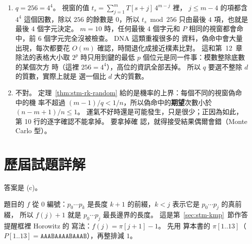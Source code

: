 \begin{enumerate}
\item $q = 256 = 4^4$。 視窗的值 $t_s = \sum_{j=1}^{m} T[s + j]\, 4^{m-j}$ 裡，
$j \le m - 4$ 的項都含 $4^4$ 這個因數，除以 $256$ 的餘數是 $0$，所以
$t_s \bmod 256$ 只由最後 $4$ 項，也就是最後 $4$ 個字元決定。 $m = 10$ 時，任何最後
$4$ 個字元和 $P$ 相同的視窗都會命中，前 $6$ 個字元完全沒被檢查。 DNA 這類重複很多的
資料，偽命中會大量出現，每次都要花 $O(m)$ 確認，時間退化成接近樸素比對。 這和第~12~章
除法的表格大小取 $2^p$ 時只用到鍵的最低 $p$ 個位元是同一件事：模數整除底數的某個次方
時（這裡 $256 = 4^4$），高位的資訊全部丟掉。 所以 $q$ 要選不整除 $d$ 的質數，實際上就是
選一個比 $d$ 大的質數。

\item 不對。 定理~\ref{thm:stm-rk-random} 給的是機率的上界：每個不同的視窗偽命中的機
率不超過 $(m - 1)/q < 1/n$，所以偽命中的\textbf{期望}次數小於 $(n - m + 1)/n \le 1$。
運氣不好時還是可能發生，只是很少；正因為如此，第 10 行的逐字確認不能拿掉。 要拿掉確
認，就得接受結果偶爾會錯（Monte Carlo 型）。
\end{enumerate}

\section*{歷屆試題詳解}

答案是 (c)。

題目的 $f$ 從 $0$ 編號：$p_0 \cdots p_k$ 是長度 $k + 1$ 的前綴，$k < j$ 表示它是 $p_0 \cdots p_j$ 的真前綴，
所以 $f(j) + 1$ 就是 $p_0 \cdots p_j$ 最長邊界的長度。 這是第~\ref{sec:stm-kmp}~節作答提醒框裡 Horowitz 的
寫法：$f(j) = \pi[j + 1] - 1$。 先用  算本書的 $\pi[1..13]$（$P[1..13] =
\mathtt{AAABAAAABAAAB}$），再整排減 $1$。

